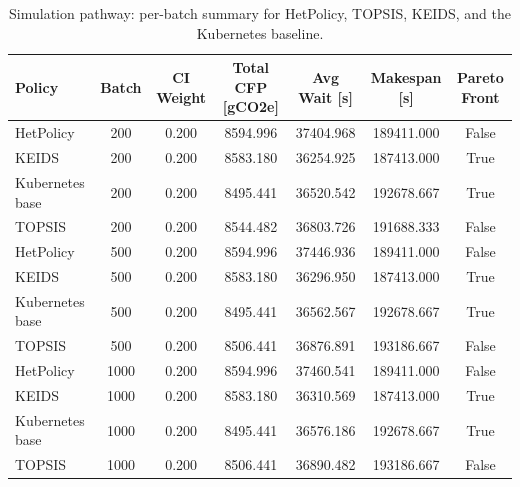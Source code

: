 \begin{table}[h!]
  \centering
  \renewcommand{\arraystretch}{1.12}
  \caption{Simulation pathway: per-batch summary for HetPolicy, TOPSIS, KEIDS, and the Kubernetes baseline.}
  \label{tab:sim-per-batch}
  \small
  \begin{tabular}{lcccccc}
  \toprule
  Policy & Batch & CI Weight & Total CFP [gCO2e] & Avg Wait [s] & Makespan [s] & Pareto Front \\
  \midrule
  HetPolicy & 200 & 0.200 & 8594.996 & 37404.968 & 189411.000 & False \\
  KEIDS & 200 & 0.200 & 8583.180 & 36254.925 & 187413.000 & True \\
  Kubernetes base & 200 & 0.200 & 8495.441 & 36520.542 & 192678.667 & True \\
  TOPSIS & 200 & 0.200 & 8544.482 & 36803.726 & 191688.333 & False \\
  HetPolicy & 500 & 0.200 & 8594.996 & 37446.936 & 189411.000 & False \\
  KEIDS & 500 & 0.200 & 8583.180 & 36296.950 & 187413.000 & True \\
  Kubernetes base & 500 & 0.200 & 8495.441 & 36562.567 & 192678.667 & True \\
  TOPSIS & 500 & 0.200 & 8506.441 & 36876.891 & 193186.667 & False \\
  HetPolicy & 1000 & 0.200 & 8594.996 & 37460.541 & 189411.000 & False \\
  KEIDS & 1000 & 0.200 & 8583.180 & 36310.569 & 187413.000 & True \\
  Kubernetes base & 1000 & 0.200 & 8495.441 & 36576.186 & 192678.667 & True \\
  TOPSIS & 1000 & 0.200 & 8506.441 & 36890.482 & 193186.667 & False \\
  \bottomrule
  \end{tabular}
\end{table}
